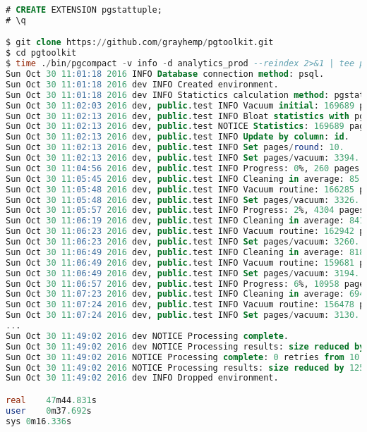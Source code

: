 \begin{lstlisting}[language=SQL,label=lst:pgcompactor8,caption=Запуск pgcompact]
# CREATE EXTENSION pgstattuple;
# \q

$ git clone https://github.com/grayhemp/pgtoolkit.git
$ cd pgtoolkit
$ time ./bin/pgcompact -v info -d analytics_prod --reindex 2>&1 | tee pgcompact.output
Sun Oct 30 11:01:18 2016 INFO Database connection method: psql.
Sun Oct 30 11:01:18 2016 dev INFO Created environment.
Sun Oct 30 11:01:18 2016 dev INFO Statictics calculation method: pgstattuple.
Sun Oct 30 11:02:03 2016 dev, public.test INFO Vacuum initial: 169689 pages left, duration 45.129 seconds.
Sun Oct 30 11:02:13 2016 dev, public.test INFO Bloat statistics with pgstattuple: duration 9.764 seconds.
Sun Oct 30 11:02:13 2016 dev, public.test NOTICE Statistics: 169689 pages (218233 pages including toasts and indexes), approximately 94.62% (160557 pages) can be compacted reducing the size by 1254 MB.
Sun Oct 30 11:02:13 2016 dev, public.test INFO Update by column: id.
Sun Oct 30 11:02:13 2016 dev, public.test INFO Set pages/round: 10.
Sun Oct 30 11:02:13 2016 dev, public.test INFO Set pages/vacuum: 3394.
Sun Oct 30 11:04:56 2016 dev, public.test INFO Progress: 0%, 260 pages completed.
Sun Oct 30 11:05:45 2016 dev, public.test INFO Cleaning in average: 85.8 pages/second (0.117 seconds per 10 pages).
Sun Oct 30 11:05:48 2016 dev, public.test INFO Vacuum routine: 166285 pages left, duration 2.705 seconds.
Sun Oct 30 11:05:48 2016 dev, public.test INFO Set pages/vacuum: 3326.
Sun Oct 30 11:05:57 2016 dev, public.test INFO Progress: 2%, 4304 pages completed.
Sun Oct 30 11:06:19 2016 dev, public.test INFO Cleaning in average: 841.6 pages/second (0.012 seconds per 10 pages).
Sun Oct 30 11:06:23 2016 dev, public.test INFO Vacuum routine: 162942 pages left, duration 4.264 seconds.
Sun Oct 30 11:06:23 2016 dev, public.test INFO Set pages/vacuum: 3260.
Sun Oct 30 11:06:49 2016 dev, public.test INFO Cleaning in average: 818.1 pages/second (0.012 seconds per 10 pages).
Sun Oct 30 11:06:49 2016 dev, public.test INFO Vacuum routine: 159681 pages left, duration 0.325 seconds.
Sun Oct 30 11:06:49 2016 dev, public.test INFO Set pages/vacuum: 3194.
Sun Oct 30 11:06:57 2016 dev, public.test INFO Progress: 6%, 10958 pages completed.
Sun Oct 30 11:07:23 2016 dev, public.test INFO Cleaning in average: 694.8 pages/second (0.014 seconds per 10 pages).
Sun Oct 30 11:07:24 2016 dev, public.test INFO Vacuum routine: 156478 pages left, duration 1.362 seconds.
Sun Oct 30 11:07:24 2016 dev, public.test INFO Set pages/vacuum: 3130.
...
Sun Oct 30 11:49:02 2016 dev NOTICE Processing complete.
Sun Oct 30 11:49:02 2016 dev NOTICE Processing results: size reduced by 1256 MB (1256 MB including toasts and indexes) in total.
Sun Oct 30 11:49:02 2016 NOTICE Processing complete: 0 retries from 10.
Sun Oct 30 11:49:02 2016 NOTICE Processing results: size reduced by 1256 MB (1256 MB including toasts and indexes) in total, 1256 MB (1256 MB) dev.
Sun Oct 30 11:49:02 2016 dev INFO Dropped environment.

real	47m44.831s
user	0m37.692s
sys	0m16.336s
\end{lstlisting}

